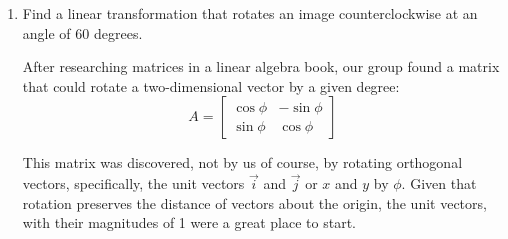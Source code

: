 \documentclass{ximera}
\begin{document}
\begin{enumerate}
$x_1 = a_{11}x_1 + a_{12}x_2$; therefore $a_{11} = 1$ and $a_{12} = 0$ to make this equation true. We then do the same to the second row equation:\\

$-x_2 = a_{21}x_1 + a_{22}x_2$\\

To make this equation true, $a_{21} = 0$ and $a_{22} = -1$.\\

Given that matrix $A = \left[\begin{array}{cc}
a_{11} & a_{12} \\ a_{21} & a_{22} \end{array}\right]$, that would mean that matrix $A =\left[\begin{array}{cc}
1 & 0 \\ 0 & -1 \end{array}\right]$.
This seems correct given that the magnitude of the vector multiplied by the reflection matrix is the same. For that reason, it comes as little surprise that the solution would look similar to the identity matrix.\\

To reflect a two-dimensional matrix across the x-axis, you can multiply by the following coefficient matrix:\\
$$A = \left[\begin{array}{cc}
1 & 0 \\ 0 & -1 \end{array}\right]$$




\item Find a linear transformation that rotates an image counterclockwise at an  angle of 60 degrees.

After researching matrices in a linear algebra book, our group found a matrix that could rotate a two-dimensional vector by a given degree:
     $$A = \left[\begin{array}{cc}
\cos\phi & -\sin\phi \\ \sin\phi & \cos\phi \end{array}\right]$$

This matrix was discovered, not by us of course, by rotating orthogonal vectors, specifically, the unit vectors $\vec{i}$ and $\vec{j}$ or $x$ and $y$ by $\phi$. Given that rotation preserves the distance of vectors about the origin, the unit vectors, with their magnitudes of 1 were a great place to start.\\


\end{enumerate}
\end{document}
